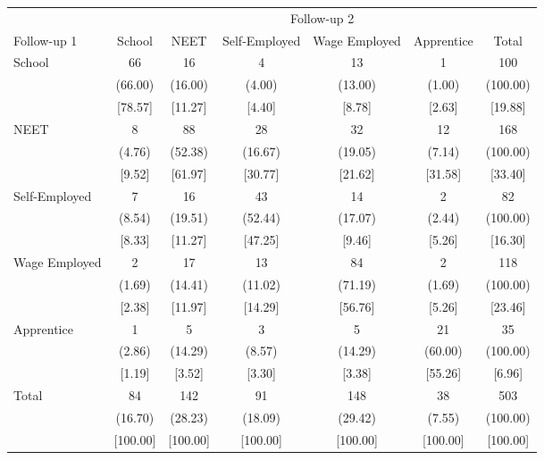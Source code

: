 {
\def\sym#1{\ifmmode^{#1}\else\(^{#1}\)\fi}
\begin{tabular}{l*{6}{c}}
\hline\hline
            &\multicolumn{6}{c}{Follow-up 2}                                              \\
Follow-up 1 &      School&        NEET&Self-Employed&Wage Employed&  Apprentice&       Total\\
\hline
School      &          66&          16&           4&          13&           1&         100\\
            &     (66.00)&     (16.00)&      (4.00)&     (13.00)&      (1.00)&    (100.00)\\
            &     [78.57]&     [11.27]&      [4.40]&      [8.78]&      [2.63]&     [19.88]\\
NEET        &           8&          88&          28&          32&          12&         168\\
            &      (4.76)&     (52.38)&     (16.67)&     (19.05)&      (7.14)&    (100.00)\\
            &      [9.52]&     [61.97]&     [30.77]&     [21.62]&     [31.58]&     [33.40]\\
Self-Employed&           7&          16&          43&          14&           2&          82\\
            &      (8.54)&     (19.51)&     (52.44)&     (17.07)&      (2.44)&    (100.00)\\
            &      [8.33]&     [11.27]&     [47.25]&      [9.46]&      [5.26]&     [16.30]\\
Wage Employed&           2&          17&          13&          84&           2&         118\\
            &      (1.69)&     (14.41)&     (11.02)&     (71.19)&      (1.69)&    (100.00)\\
            &      [2.38]&     [11.97]&     [14.29]&     [56.76]&      [5.26]&     [23.46]\\
Apprentice  &           1&           5&           3&           5&          21&          35\\
            &      (2.86)&     (14.29)&      (8.57)&     (14.29)&     (60.00)&    (100.00)\\
            &      [1.19]&      [3.52]&      [3.30]&      [3.38]&     [55.26]&      [6.96]\\
Total       &          84&         142&          91&         148&          38&         503\\
            &     (16.70)&     (28.23)&     (18.09)&     (29.42)&      (7.55)&    (100.00)\\
            &    [100.00]&    [100.00]&    [100.00]&    [100.00]&    [100.00]&    [100.00]\\
\hline\hline
\end{tabular}
}
